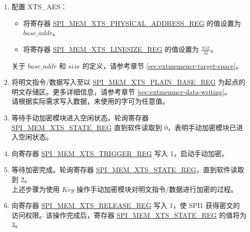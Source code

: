 \documentclass[main\_\_CN.tex]{subfiles}
\begin{document}
\begin{enumerate}

    \item 配置 XTS\_AES：
    \begin{itemize}
        \item 将寄存器 \hyperref[regdesc:SPIMEMXTSPHYSICALADDRESSREG]{SPI\_MEM\_XTS\_PHYSICAL\_ADDRESS\_REG} 的值设置为 \begin{math}base\_addr\end{math}。
        \item 将寄存器 \hyperref[regdesc:SPIMEMXTSLINESIZEREG]{SPI\_MEM\_XTS\_LINESIZE\_REG} 的值设置为 \begin{math}\frac{size}{32}\end{math}。
    \end{itemize}
    关于 \begin{math} base\_addr\end{math} 和 \begin{math}size\end{math} 的定义，请参考章节 \ref{sec:extmemencr-target-space}。
    \item 将明文指令/数据写入至以 \hyperref[regdesc:SPIMEMXTSPLAINBASEREG]{SPI\_MEM\_XTS\_PLAIN\_BASE\_REG} 为起点的明文存储区。更多详细信息，请参考章节 \ref{sec:extmemncr-data-writing}。\\请根据实际需求写入数据，未使用的字可为任意值。

    \item 等待手动加密模块进入空闲状态。轮询寄存器 \hyperref[regdesc:SPIMEMXTSSTATEREG]{SPI\_MEM\_XTS\_STATE\_REG} 直到软件读取到 0，表明手动加密模块已进入空闲状态。

    \item 向寄存器 \hyperref[regdesc:SPIMEMXTSTRIGGERREG]{SPI\_MEM\_XTS\_TRIGGER\_REG} 写入 1，启动手动加密。

    \item 等待加密完成。轮询寄存器 \hyperref[regdesc:SPIMEMXTSSTATEREG]{SPI\_MEM\_XTS\_STATE\_REG}，直到软件读取到 2。\\
    上述步骤为使用 \begin{math}\mathit{Key}\end{math} 操作手动加密模块对明文指令/数据进行加密的过程。

    \item 向寄存器 \hyperref[regdesc:SPIMEMXTSRELEASEREG]{SPI\_MEM\_XTS\_RELEASE\_REG} 写入 1，使 SPI1 获得密文的访问权限。该操作完成后，寄存器 \hyperref[regdesc:SPIMEMXTSSTATEREG]{SPI\_MEM\_XTS\_STATE\_REG} 的值将为 3。


\end{enumerate}
\end{document}
